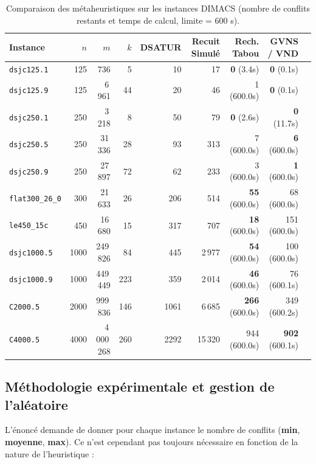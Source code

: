 \documentclass{article}
\begin{document}
\begin{table}[H]
\centering
\small
\setlength{\tabcolsep}{5pt}
\begin{tabular}{lrrrrrrrr}
\toprule
\textbf{Instance} & $n$ & $m$ & $k$ & \textbf{DSATUR} & \textbf{Recuit Simulé} & \textbf{Rech. Tabou} & \textbf{GVNS / VND} \\
\midrule
\texttt{dsjc125.1}      & 125  & 736         & 5   & 10   & 17     & \textbf{0} (3.4s)   & \textbf{0} (0.1s) \\
\texttt{dsjc125.9}      & 125  & 6\,961      & 44  & 20   & 46     & 1 (600.0s)          & \textbf{0} (0.1s) \\
\texttt{dsjc250.1}      & 250  & 3\,218      & 8   & 50   & 79     & \textbf{0} (2.6s)   & \textbf{0} (11.7s) \\
\texttt{dsjc250.5}      & 250  & 31\,336     & 28  & 93   & 313    & 7 (600.0s)          & \textbf{6} (600.0s) \\
\texttt{dsjc250.9}      & 250  & 27\,897     & 72  & 62   & 233    & 3 (600.0s)          & \textbf{1} (600.0s) \\
\texttt{flat300\_26\_0} & 300  & 21\,633     & 26  & 206  & 514    & \textbf{55} (600.0s) & 68 (600.0s) \\
\texttt{le450\_15c}     & 450  & 16\,680     & 15  & 317  & 707    & \textbf{18} (600.0s) & 151 (600.0s) \\
\texttt{dsjc1000.5}     & 1000 & 249\,826    & 84  & 445  & 2\,977 & \textbf{54} (600.0s) & 100 (600.0s) \\
\texttt{dsjc1000.9}     & 1000 & 449\,449    & 223 & 359  & 2\,014 & \textbf{46} (600.0s) & 76 (600.1s) \\
\texttt{C2000.5}        & 2000 & 999\,836    & 146 & 1061 & 6\,685 & \textbf{266} (600.0s) & 349 (600.2s) \\
\texttt{C4000.5}        & 4000 & 4\,000\,268 & 260 & 2292 & 15\,320 & 944 (600.0s)        & \textbf{902} (600.1s) \\
\bottomrule
\end{tabular}
\caption{Comparaison des métaheuristiques sur les instances DIMACS (nombre de conflits restants et temps de calcul, limite = 600 s).}
\label{tab:benchmark_global}
\end{table}

\subsection{Méthodologie expérimentale et gestion de l'aléatoire}
L'énoncé demande de donner pour chaque instance le nombre de conflits (\textbf{min}, \textbf{moyenne}, \textbf{max}). Ce n'est cependant pas toujours nécessaire en fonction de la nature de l'heuristique :
\end{document}
